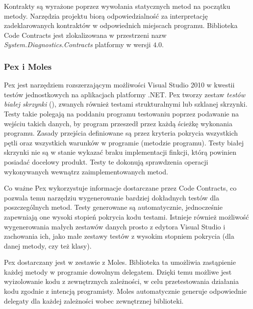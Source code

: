 Kontrakty są wyrażone poprzez wywołania statycznych metod na początku metody. Narzędzia projektu biorą odpowiedzialność za interpretację zadeklarowanych kontraktów w odpowiednich miejscach programu. Biblioteka Code Contracts jest zlokalizowana w przestrzeni nazw \emph{System.Diagnostics.Contracts} platformy w wersji $4.0$.

\subsubsection{Pex i Moles\label{04:pex}}
Pex jest narzędziem rozszerzającym możliwości Visual Studio 2010 w kwestii testów jednostkowych na aplikacjach platformy .NET. Pex tworzy zestaw \emph{testów białej skrzynki} (), zwanych również testami strukturalnymi lub szklanej skrzynki. Testy takie polegają na poddaniu programu testowaniu poprzez podawanie na wejściu takich danych, by program przeszedł przez każdą ścieżkę wykonania programu. Zasady przejścia definiowane są przez kryteria pokrycia wszystkich pętli oraz wszystkich warunków w programie (metodzie programu). Testy białej skrzynki nie są w stanie wykazać braku implementacji finkcji, którą powinien posiadać docelowy produkt. Testy te dokonują sprawdzenia operacji wykonywanych wewnątrz zaimplementowanych metod. 

Co ważne Pex wykorzystuje informacje dostarczane przez Code Contracts, co pozwala temu narzędziu wygenerowanie bardziej dokładnych testów dla poszczególnych metod. Testy generowane są automatycznie, jednocześnie zapewniają one wysoki stopień pokrycia kodu testami. Istnieje również możliwość wygenerowania małych zestawów danych prosto z edytora Visual Studio i zachowania ich, jako małe zestawy testów z wysokim stopniem pokrycia (dla danej metody, czy też klasy).

Pex dostarczany jest w zestawie z Moles. Biblioteka ta umożliwia zastąpienie każdej metody w programie dowolnym delegatem. Dzięki temu możliwe jest wyizolowanie kodu z zewnętrznych zależności, w celu przetestowania działania kodu zgodnie z intencją programisty. Moles automatycznie generuje odpowiednie delegaty dla każdej zależności wobec zewnętrznej biblioteki.